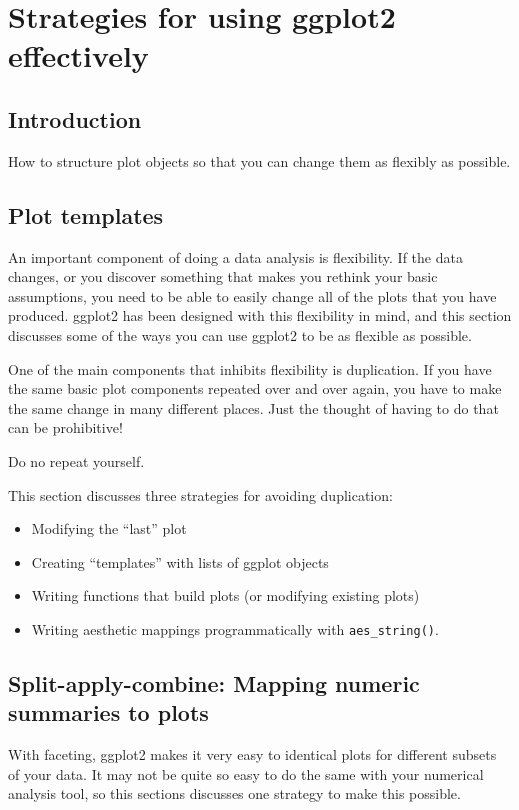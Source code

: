 

\chapter{Strategies for using ggplot2 effectively}
\section{Introduction}


How to structure plot objects so that you can change them as flexibly as possible.

\section{Plot templates}
\label{sec:templates}

An important component of doing a data analysis is flexibility.  If the data changes, or you discover something that makes you rethink your basic assumptions, you need to be able to easily change all of the plots that you have produced.  ggplot2 has been designed with this flexibility in mind, and this section discusses some of the ways you can use ggplot2 to be as flexible as possible.

One of the main components that inhibits flexibility is duplication. If you have the same basic plot components repeated over and over again, you have to make the same change in many different places.  Just the thought of having to do that can be prohibitive!

Do no repeat yourself.

This section discusses three strategies for avoiding duplication:

\begin{itemize}
  \item Modifying the ``last'' plot

  \item Creating ``templates'' with lists of ggplot objects

  \item Writing functions that build plots (or modifying existing plots)

  \item Writing aesthetic mappings programmatically with {\tt aes\_string()}.
\end{itemize}


\section{Split-apply-combine: Mapping numeric summaries to plots}
\label{sec:split_apply_combine}

With faceting, ggplot2 makes it very easy to identical plots for different subsets of your data.  It may not be quite so easy to do the same with your numerical analysis tool, so this sections discusses one strategy to make this possible.  



